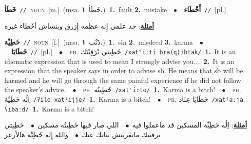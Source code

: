 \documentclass[10pt,a4paper,twoside]{article} %
\begin{document}
\begin{multicols}{2}
{\setlength\topsep{0pt}\textbf{\foreignlanguage{arabic}{خَطَأ}}\ {\color{gray}\texttt{//}\color{black}}\ \textsc{noun}\ [m.]\ \color{gray}(msa. \foreignlanguage{arabic}{خَطَأ}~\foreignlanguage{arabic}{\textbf{١.}})\color{black}\ \textbf{1.}~fault  \textbf{2.}~mistake\ \ $\bullet$\ \ \setlength\topsep{0pt}\textbf{\foreignlanguage{arabic}{أَخْطَاء}}\ {\color{gray}\texttt{//}\color{black}}\ [pl.]\  \begin{flushright}\color{gray}\foreignlanguage{arabic}{\textbf{\underline{\foreignlanguage{arabic}{أمثلة}}}: حد علمي إِنه عظمه إِزرق وبنساش أخْطاء غيره}\end{flushright}\color{black}} \vspace{2mm}

{\setlength\topsep{0pt}\textbf{\foreignlanguage{arabic}{خَطِيِّة}}\ {\color{gray}\texttt{//}\color{black}}\ \textsc{noun}\ [f.]\ \color{gray}(msa. \foreignlanguage{arabic}{ذَنْب}~\foreignlanguage{arabic}{\textbf{١.}})\color{black}\ \textbf{1.}~sin  \textbf{2.}~misdeed  \textbf{3.}~karma\ \ $\bullet$\ \ \setlength\topsep{0pt}\textbf{\foreignlanguage{arabic}{خَطَايَا}}\ {\color{gray}\texttt{//}\color{black}}\ [pl.]\ \ $\bullet$\ \ \textsc{ph.} \color{gray} \foreignlanguage{arabic}{خَطِيتي بْرَقِبْتَك}\color{black}\ {\color{gray}\texttt{/{\sffamily xatˤiːti bra(q)ibtak}/}\color{black}}\ \textbf{1.}~It is an idiomatic expression that is used to mean I strongly advise you....  \textbf{2.}~It is an expression that the speaker says in order to advise sb. He means that sb will be harmed and he will go through the same painful experience if he did not follow the speaker's advice.\ \ $\bullet$\ \ \textsc{ph.} \color{gray} \foreignlanguage{arabic}{خَطِيتُه}\color{black}\ {\color{gray}\texttt{/{\sffamily xatˤiːto}/}\color{black}}\ \textbf{1.}~Karma is a bitch!\ \ $\bullet$\ \ \textsc{ph.} \color{gray} \foreignlanguage{arabic}{اِلُه خَطِيِّة}\color{black}\ {\color{gray}\texttt{/{\sffamily ʔilo xatˤijje}/}\color{black}}\ \textbf{1.}~Karma is a bitch!\ \ $\bullet$\ \ \textsc{ph.} \color{gray} \foreignlanguage{arabic}{خَطَايَا عِبَاد}\color{black}\ {\color{gray}\texttt{/{\sffamily xatˤaːja ʕibaːd}/}\color{black}}\ \textbf{1.}~Karma is a bitch!\  \begin{flushright}\color{gray}\foreignlanguage{arabic}{\textbf{\underline{\foreignlanguage{arabic}{أمثلة}}}: اِلُه خَطِيِّة المسكين قد ماعملوا فيه\ $\bullet$\ \  اللي صار فيها خَطِيتُه مسكين\ $\bullet$\ \  خَطِيتي برقبتك ماتغربيش بناتك عنك\ $\bullet$\ \  والله إِله خَطِيِّة هالأزعر}\end{flushright}\color{black}} \vspace{2mm}


\end{multicols}
\end{document}
